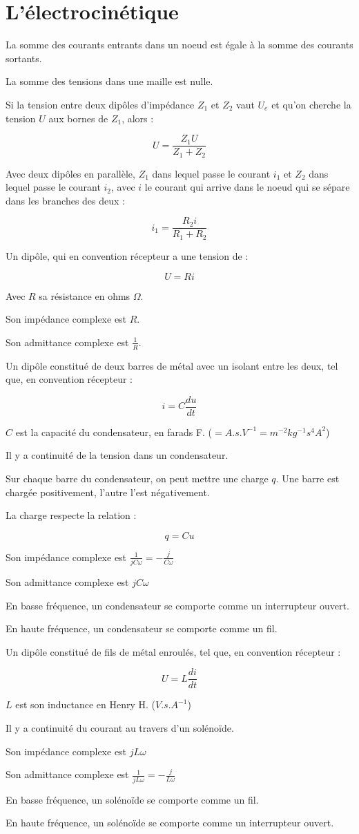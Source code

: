 \documentclass[a4paper,12pt]{book}
\newcommand{\Def}[2]{\begin{tcolorbox}[colback=white,colframe=red!10!green!20!blue!75!, title=Définition : #1]#2\end{tcolorbox}}
\newcommand{\Thr}[2]{\begin{tcolorbox}[sharp corners, colback=white,colframe=red!10!blue!30!green!75!, title=Théorème : #1]#2\end{tcolorbox}}
\begin{document}
\section{L'électrocinétique}
\Thr{Loi des noeuds}{La somme des courants entrants dans un noeud est égale à la somme des courants sortants.}
\Thr{Loi des mailles}{La somme des tensions dans une maille est nulle.}
\Thr{Pont diviseur de tension}{Si la tension entre deux dipôles d'impédance $Z_1$ et $Z_2$ vaut $U_e$ et qu'on cherche la tension $U$ aux bornes de $Z_1$, alors :
\par $$U =\frac{Z_1U}{Z_1+Z_2}$$}
\Thr{Pont diviseur de courant}{Avec deux dipôles en parallèle, $Z_1$ dans lequel passe le courant $i_1$ et $Z_2$ dans lequel passe le courant $i_2$, avec $i$ le courant qui arrive dans le noeud qui se sépare dans les branches des deux :
\par $$i_1 =\dfrac{R_2i}{R_1+R_2}$$}
\Def{La résistance}{Un dipôle, qui en convention récepteur a une tension de :
\par $$U = Ri$$
\par Avec $R$ sa résistance en ohms $\Omega$.
\par Son impédance complexe est $R$.
\par Son admittance complexe est $\frac{1}{R}$.}
\Def{Le condensateur}{Un dipôle constitué de deux barres de métal avec un isolant entre les deux, tel que, en convention récepteur :
\par $$i = C\dfrac{d u}{dt}$$
\par $C$ est la capacité du condensateur, en farads F. ($=A.s.V^{-1}=m^{-2}kg^{-1}s^4A^2$)
\par Il y a continuité de la tension dans un condensateur.
\par Sur chaque barre du condensateur, on peut mettre une charge $q$. Une barre est chargée positivement, l'autre l'est négativement.
\par La charge respecte la relation :
\par $$q = Cu$$
\par Son impédance complexe est $\frac{1}{jC\omega}=-\frac{j}{C\omega}$
\par Son admittance complexe est $jC\omega$
\par En basse fréquence, un condensateur se comporte comme un interrupteur ouvert.
\par En haute fréquence, un condensateur se comporte comme un fil.}
\Def{Le solénoïde}{Un dipôle constitué de fils de métal enroulés, tel que, en convention récepteur :
\par $$U = L\dfrac{di}{dt}$$
\par $L$ est son inductance en Henry H. ($V.s.A^{-1}$)
\par Il y a continuité du courant au travers d'un solénoïde.
\par Son impédance complexe est $jL\omega$
\par Son admittance complexe est $\frac{1}{jL\omega}=-\frac{j}{L\omega}$
\par En basse fréquence, un solénoïde se comporte comme un fil.
\par En haute fréquence, un solénoïde se comporte comme un interrupteur ouvert.}
\end{document}
